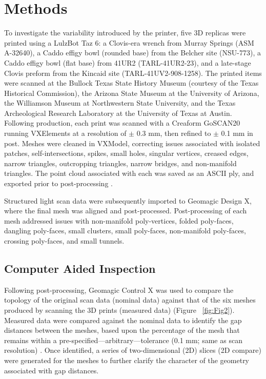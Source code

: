 \documentclass[review]{elsarticle}
\begin{document}
\section*{Methods}

To investigate the variability introduced by the printer, five 3D replicas were printed using a LulzBot Taz 6: a Clovis-era wrench from Murray Springs (ASM A-32640), a Caddo effigy bowl (rounded base) from the Belcher site (NSU-773), a Caddo effigy bowl (flat base) from 41UR2 (TARL-41UR2-23), and a late-stage Clovis preform from the Kincaid site (TARL-41UV2-908-1258). The printed items were scanned at the Bullock Texas State History Museum (courtesy of the Texas Historical Commission), the Arizona State Museum at the University of Arizona, the Williamson Museum at Northwestern State University, and the Texas Archeological Research Laboratory at the University of Texas at Austin. Following production, each print was scanned with a Creaform GoSCAN20 running VXElements at a resolution of $\pm$ 0.3 mm, then refined to $\pm$ 0.1 mm in post. Meshes were cleaned in VXModel, correcting issues associated with isolated patches, self-intersections, spikes, small holes, singular vertices, creased edges, narrow triangles, outcropping triangles, narrow bridges, and non-manifold triangles. The point cloud associated with each was saved as an ASCII ply, and exported prior to post-processing \citep{RN5585}.

Structured light scan data \citep{RN5931,RN5924} were subsequently imported to Geomagic Design X, where the final mesh was aligned and post-processed. Post-processing of each mesh addressed issues with non-manifold poly-vertices, folded poly-faces, dangling poly-faces, small clusters, small poly-faces, non-manifold poly-faces, crossing poly-faces, and small tunnels.

\subsection*{Computer Aided Inspection}

Following post-processing, Geomagic Control X was used to compare the topology of the original scan data (nominal data) against that of the six meshes produced by scanning the 3D prints (measured data) (Figure ~\ref{fig:Fig2}). Measured data were compared against the nominal data \citep{RN11463,RN5923,RN11460,RN11465} to identify the gap distances between the meshes, based upon the percentage of the mesh that remains within a pre-specified---arbitrary---tolerance (0.1 mm; same as scan resolution) \citep{RN5925,RN11471,RN11455}. Once identified, a series of two-dimensional (2D) slices (2D compare) were generated for the meshes to further clarify the character of the geometry associated with gap distances.
\end{document}
